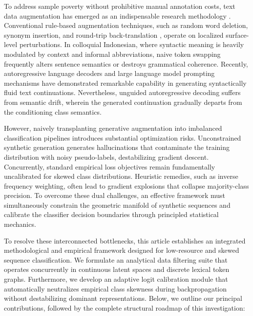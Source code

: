 \documentclass{ieeeaccess}
\begin{document}
To address sample poverty without prohibitive manual annotation costs, text data augmentation has emerged as an indispensable research methodology \cite{feng2021survey, shorten2021text}. Conventional rule-based augmentation techniques, such as random word deletion, synonym insertion, and round-trip back-translation \cite{feng2021survey, shorten2021text}, operate on localized surface-level perturbations. In colloquial Indonesian, where syntactic meaning is heavily modulated by context and informal abbreviations, naive token swapping frequently alters sentence semantics or destroys grammatical coherence. Recently, autoregressive language decoders and large language model prompting mechanisms \cite{refai2023data, dai2023augmenting, ding2024gpt4} have demonstrated remarkable capability in generating syntactically fluid text continuations. Nevertheless, unguided autoregressive decoding suffers from semantic drift, wherein the generated continuation gradually departs from the conditioning class semantics.

However, naively transplanting generative augmentation into imbalanced classification pipelines introduces substantial optimization risks. Unconstrained synthetic generation generates hallucinations that contaminate the training distribution with noisy pseudo-labels, destabilizing gradient descent. Concurrently, standard empirical loss objectives remain fundamentally uncalibrated for skewed class distributions. Heuristic remedies, such as inverse frequency weighting, often lead to gradient explosions that collapse majority-class precision. To overcome these dual challenges, an effective framework must simultaneously constrain the geometric manifold of synthetic sequences and calibrate the classifier decision boundaries through principled statistical mechanics.

To resolve these interconnected bottlenecks, this article establishes an integrated methodological and empirical framework designed for low-resource and skewed sequence classification. We formulate an analytical data filtering suite that operates concurrently in continuous latent spaces and discrete lexical token graphs. Furthermore, we develop an adaptive logit calibration module that automatically neutralizes empirical class skewness during backpropagation without destabilizing dominant representations. Below, we outline our principal contributions, followed by the complete structural roadmap of this investigation:
\end{document}
